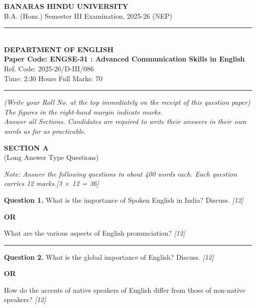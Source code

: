\documentclass[11pt,a4paper]{article}
\newcommand{\pts}[1]{\hfill \textit{[#1]}}
\begin{document}
\begin{center}
  {\large\bfseries BANARAS HINDU UNIVERSITY}\\[2pt]
  {\normalsize B.A. (Hons.) Semester III Examination, 2025-26 (NEP)}\\[6pt]
  \rule{0.8\linewidth}{0.5pt}\\[6pt]
  {\large\bfseries DEPARTMENT OF ENGLISH}\\[4pt]
  {\large\bfseries Paper Code: ENGSE-31 : Advanced Communication Skills in English}\\[2pt]
  {\small Ref. Code: 2025-26/D-III/086}\\[4pt]
  {\normalsize Time: 2:30 Hours \hfill Full Marks: 70}
\end{center}

\rule{\linewidth}{0.4pt}

\smallskip

\noindent \textit{(Write your Roll No. at the top immediately on the receipt of this question paper)}\\[2pt]
\noindent \textit{The figures in the right-hand margin indicate marks.}\\[1pt]
\noindent \textit{Answer all Sections. Candidates are required to write their answers in their own words as far as practicable.}

\bigskip

\begin{center}
  {\large\bfseries SECTION A}\\[2pt]
  {\normalsize (Long Answer Type Questions)}
\end{center}

\noindent \textit{Note: Answer the following questions in about 400 words each. Each question carries 12 marks.}\pts{3 $\times$ 12 = 36}

\bigskip

\noindent \textbf{Question 1.} What is the importance of Spoken English in India? Discuss. \pts{12}
\begin{center}\textbf{OR}\end{center}
What are the various aspects of English pronunciation? \pts{12}

\medskip\rule{\linewidth}{0.2pt}\medskip

\noindent \textbf{Question 2.} What is the global importance of English? Discuss. \pts{12}
\begin{center}\textbf{OR}\end{center}
How do the accents of native speakers of English differ from those of non-native speakers? \pts{12}
\end{document}

